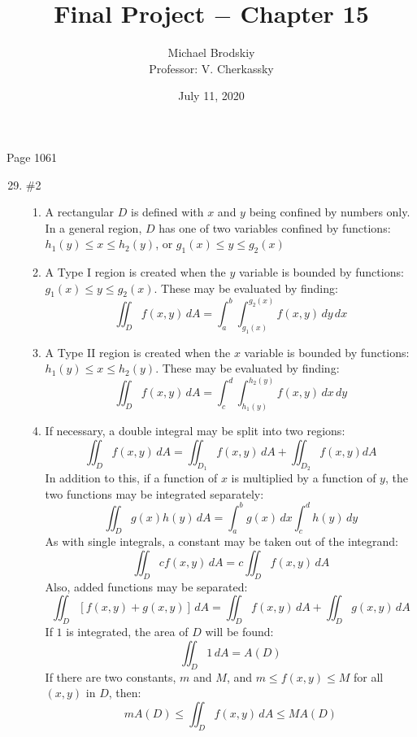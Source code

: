 \documentclass[12pt]{article}
\title{Final Project $-$ Chapter 15}
\date{July 11, 2020}
\author{Michael Brodskiy\\ \small Professor: V. Cherkassky}
\begin{document}
\maketitle

\begin{center}

Page 1061

\end{center}

\begin{enumerate}

\setcounter{enumi}{28}

  \item \#2 \begin{enumerate}

      \item A rectangular $D$ is defined with $x$ and $y$ being confined by numbers only. In a general region, $D$ has one of two variables confined by functions: $h_1(y)\leq x\leq h_2(y)$, or $g_1(x)\leq y\leq g_2(x)$

      \item A Type I region is created when the $y$ variable is bounded by functions: $g_1(x)\leq y\leq g_2(x)$. These may be evaluated by finding: 
        $$\iint_D f(x,y)\,dA = \int_a^b\int_{g_1(x)}^{g_2(x)} f(x,y)\,dy\,dx$$

      \item A Type II region is created when the $x$ variable is bounded by functions: $h_1(y)\leq x\leq h_2(y)$. These may be evaluated by finding: 
        $$\iint_D f(x,y)\,dA = \int_c^d\int_{h_1(y)}^{h_2(y)} f(x,y)\,dx\,dy$$

      \item If necessary, a double integral may be split into two regions: 
        $$\iint_D f(x,y)\,dA=\iint_{D_1}f(x,y)\,dA+\iint_{D_2}f(x,y)dA$$
In addition to this, if a function of $x$ is multiplied by a function of $y$, the two functions may be integrated separately:
$$\iint_Dg(x)h(y)\,dA=\int_a^bg(x)\,dx\int_c^dh(y)\,dy$$
As with single integrals, a constant may be taken out of the integrand:
$$\iint_D cf(x,y)\,dA=c\iint_Df(x,y)\,dA$$
Also, added functions may be separated:
$$\iint_D [f(x,y)+g(x,y)]\,dA=\iint_D f(x,y)\,dA+\iint_D g(x,y)\,dA$$
If $1$ is integrated, the area of $D$ will be found:
$$\iint_D 1\,dA=A(D)$$
If there are two constants, $m$ and $M$, and $m\leq f(x,y)\leq M$ for all $(x,y)$ in $D$, then:
$$mA(D)\leq \iint_D f(x,y)\,dA\leq MA(D)$$

    \end{enumerate}


\end{enumerate}
\end{document}
